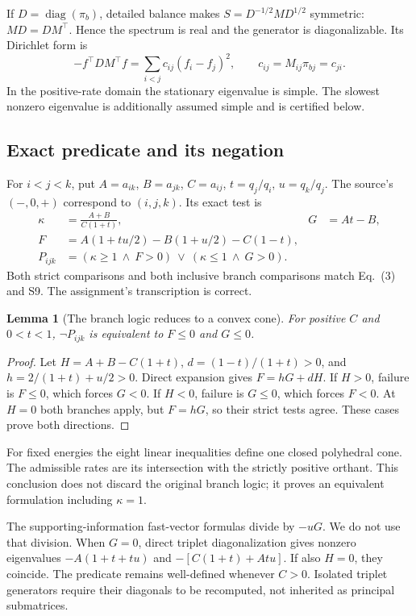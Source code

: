 \documentclass[11pt]{article}
\newtheorem{lemma}{Lemma}
\newcommand{\diag}{\operatorname{diag}}
\begin{document}
If $D=\diag(\pi_b)$, detailed balance makes $S=D^{-1/2}MD^{1/2}$ symmetric: $MD=DM^\top$. Hence the spectrum is real and the generator is diagonalizable. Its Dirichlet form is
\[
-f^\top D M^\top f=\sum_{i<j}c_{ij}(f_i-f_j)^2,\qquad c_{ij}=M_{ij}\pi_{bj}=c_{ji}.
\]
In the positive-rate domain the stationary eigenvalue is simple. The slowest nonzero eigenvalue is additionally assumed simple and is certified below.

\subsection{Exact predicate and its negation}
For $i<j<k$, put $A=a_{ik}$, $B=a_{jk}$, $C=a_{ij}$, $t=q_j/q_i$, $u=q_k/q_j$. The source's $(-,0,+)$ correspond to $(i,j,k)$. Its exact test is
\begin{align*}
\kappa&=\frac{A+B}{C(1+t)},&G&=At-B,\\
F&=A(1+tu/2)-B(1+u/2)-C(1-t),\\
P_{ijk}&=(\kappa\geq1\ \land\ F>0)\ \lor\ (\kappa\leq1\ \land\ G>0).
\end{align*}
Both strict comparisons and both inclusive branch comparisons match Eq.~(3) and S9. The assignment's transcription is correct.

\begin{lemma}[The branch logic reduces to a convex cone]
For positive $C$ and $0<t<1$, $\neg P_{ijk}$ is equivalent to $F\leq0$ and $G\leq0$.
\end{lemma}
\begin{proof}
Let $H=A+B-C(1+t)$, $d=(1-t)/(1+t)>0$, and $h=2/(1+t)+u/2>0$. Direct expansion gives $F=hG+dH$. If $H>0$, failure is $F\leq0$, which forces $G<0$. If $H<0$, failure is $G\leq0$, which forces $F<0$. At $H=0$ both branches apply, but $F=hG$, so their strict tests agree. These cases prove both directions.
\end{proof}
For fixed energies the eight linear inequalities define one closed polyhedral cone. The admissible rates are its intersection with the strictly positive orthant. This conclusion does not discard the original branch logic; it proves an equivalent formulation including $\kappa=1$.

The supporting-information fast-vector formulas divide by $-uG$. We do not use that division. When $G=0$, direct triplet diagonalization gives nonzero eigenvalues $-A(1+t+tu)$ and $-[C(1+t)+Atu]$. If also $H=0$, they coincide. The predicate remains well-defined whenever $C>0$. Isolated triplet generators require their diagonals to be recomputed, not inherited as principal submatrices.
\end{document}
